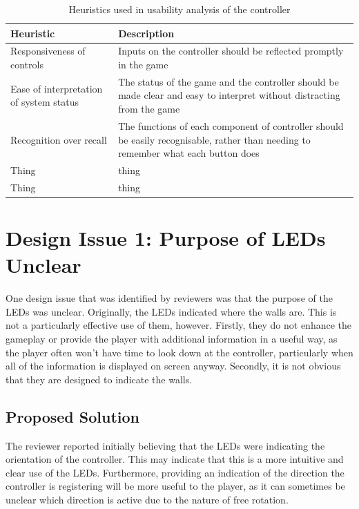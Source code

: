 \documentclass{scrartcl}
\begin{document}
\begin{table}
\centering
\begin{tabular}{| l | p{6cm} |}
\hline
\textbf{Heuristic} & \textbf{Description} \\ \hline
Responsiveness of controls & Inputs on the controller should be reflected promptly in the game \\ \hline
Ease of interpretation of system status & The status of the game and the controller should be made clear and easy to interpret without distracting from the game \\ \hline
Recognition over recall & The functions of each component of controller should be easily recognisable, rather than needing to remember what each button does \\ \hline
Thing & thing \\ \hline
Thing & thing \\ \hline
\end{tabular}
\caption{Heuristics used in usability analysis of the controller}
\label{table:heuristics}
\end{table}

\section{Design Issue 1: Purpose of LEDs Unclear}
One design issue that was identified by reviewers was that the purpose of the LEDs was unclear. Originally, the LEDs indicated where the walls are. This is not a particularly effective use of them, however. Firstly, they do not enhance the gameplay or provide the player with additional information in a useful way, as the player often won't have time to look down at the controller, particularly when all of the information is displayed on screen anyway. Secondly, it is not obvious that they are designed to indicate the walls.

\subsection{Proposed Solution}
The reviewer reported initially believing that the LEDs were indicating the orientation of the controller. This may indicate that this is a more intuitive and clear use of the LEDs. Furthermore, providing an indication of the direction the controller is registering will be more useful to the player, as it can sometimes be unclear which direction is active due to the nature of free rotation.
\end{document}
